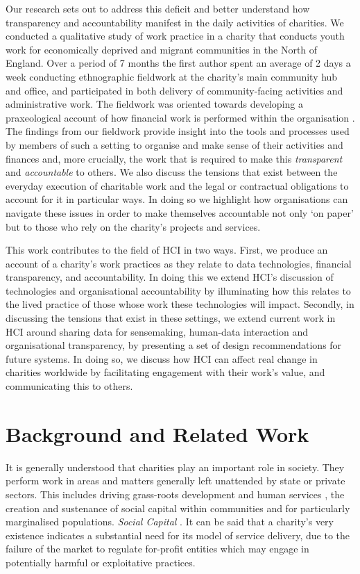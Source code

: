 Our research sets out to address this deficit and better understand how transparency and accountability manifest in the daily activities of charities. We conducted a qualitative study of work practice in a charity that conducts youth work for economically deprived and migrant communities in the North of England. Over a period of 7 months the first author spent an average of 2 days a week conducting ethnographic fieldwork at the charity's main community hub and office, and participated in both delivery of community-facing activities and administrative work. The fieldwork was oriented towards developing a praxeological account of how financial work is performed within the organisation \cite{crabtree_doing_2012}. The findings from our fieldwork provide insight into the tools and processes used by members of such a setting to organise and make sense of their activities and finances and, more crucially, the work that is required to make this \textit{transparent} and \textit{accountable} to others. We also discuss the tensions that exist between the everyday execution of charitable work and the legal or contractual obligations to account for it in particular ways. In doing so we highlight how organisations can navigate these issues in order to make themselves accountable not only `on paper' but to those who rely on the charity's projects and services.


This work contributes to the field of HCI in two ways. First, we produce an account of a charity's work practices as they relate to data technologies, financial transparency, and accountability. In doing this we extend HCI's discussion of technologies and organisational accountability \cite{marshall_accountable:_2016} by illuminating how this relates to the lived practice of those whose work these technologies will impact. Secondly, in discussing the tensions that exist in these settings, we extend current work in HCI around sharing data for sensemaking, human-data interaction and organisational transparency, by presenting a set of design recommendations for future systems. In doing so, we discuss how HCI can affect real change in charities worldwide by facilitating engagement with their work's value, and communicating this to others.

\section{Background and Related Work}
It is generally understood that charities play an important role in society. They perform work in areas and matters generally left unattended by state or private sectors. This includes driving grass-roots development and human services \cite{salamon_rise_1994}, the creation and sustenance of social capital within communities and for particularly marginalised populations. \textit{Social Capital} \cite{field_social_2003, mendel_doing_2014}. It can be said that a charity's very existence indicates a substantial need for its model of service delivery, due to the failure of the market to regulate for-profit entities which may engage in potentially harmful or exploitative practices\cite{hansmann_role_1980}.

